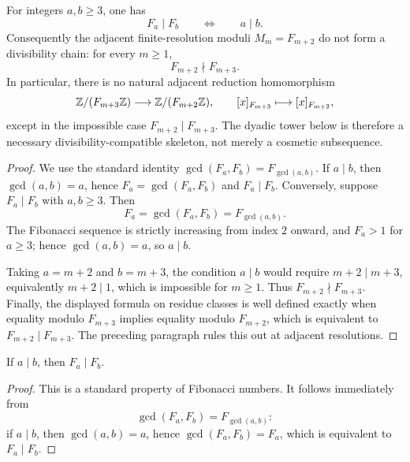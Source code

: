 \begin{lemma}\label{lem:adjacent-resolution-obstruction}
For integers \(a,b\ge3\), one has
\[
F_a\mid F_b\qquad\Longleftrightarrow\qquad a\mid b.
\]
Consequently the adjacent finite-resolution moduli \(M_m=F_{m+2}\) do not form a divisibility chain: for every \(m\ge1\),
\[
F_{m+2}\nmid F_{m+3}.
\]
In particular, there is no natural adjacent reduction homomorphism
\[
\mathbb{Z}/(F_{m+3}\mathbb{Z})\longrightarrow \mathbb{Z}/(F_{m+2}\mathbb{Z}),
\qquad [x]_{F_{m+3}}\longmapsto [x]_{F_{m+2}},
\]
except in the impossible case \(F_{m+2}\mid F_{m+3}\). The dyadic tower below is therefore a necessary divisibility-compatible skeleton, not merely a cosmetic subsequence.
\end{lemma}

\begin{proof}
We use the standard identity \(\gcd(F_a,F_b)=F_{\gcd(a,b)}\). If \(a\mid b\), then \(\gcd(a,b)=a\), hence \(F_a=\gcd(F_a,F_b)\) and \(F_a\mid F_b\). Conversely, suppose \(F_a\mid F_b\) with \(a,b\ge3\). Then
\[
F_a=\gcd(F_a,F_b)=F_{\gcd(a,b)}.
\]
The Fibonacci sequence is strictly increasing from index \(2\) onward, and \(F_a>1\) for \(a\ge3\); hence \(\gcd(a,b)=a\), so \(a\mid b\).

Taking \(a=m+2\) and \(b=m+3\), the condition \(a\mid b\) would require \(m+2\mid m+3\), equivalently \(m+2\mid1\), which is impossible for \(m\ge1\). Thus \(F_{m+2}\nmid F_{m+3}\). Finally, the displayed formula on residue classes is well defined exactly when equality modulo \(F_{m+3}\) implies equality modulo \(F_{m+2}\), which is equivalent to \(F_{m+2}\mid F_{m+3}\). The preceding paragraph rules this out at adjacent resolutions.
\end{proof}

\begin{lemma}\label{lem:fib-divisibility-chain}
If \(a\mid b\), then \(F_a\mid F_b\).
\end{lemma}

\begin{proof}
This is a standard property of Fibonacci numbers. It follows immediately from
\[
\gcd(F_a,F_b)=F_{\gcd(a,b)}:
\]
if \(a\mid b\), then \(\gcd(a,b)=a\), hence \(\gcd(F_a,F_b)=F_a\), which is equivalent to \(F_a\mid F_b\).
\end{proof}

